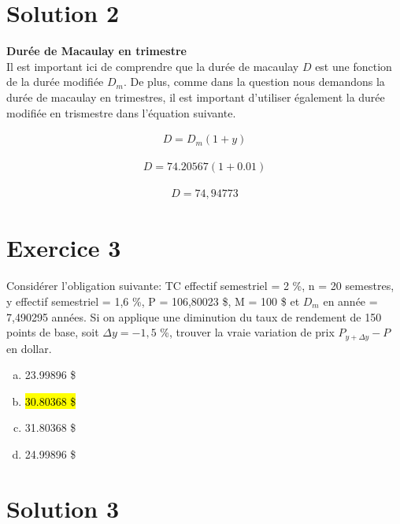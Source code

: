 \documentclass[10pt,a4paper]{article}
\begin{document}
\section*{Solution 2}

\textbf{Durée de Macaulay en trimestre} \\

Il est important ici de comprendre que la durée de macaulay $D$ est une fonction de la durée modifiée $D_m$.  De plus,  comme dans la question nous demandons la durée de macaulay en trimestres,  il est important d'utiliser également la durée modifiée en trismestre dans l'équation suivante.

\begin{align*}
D=D_m (1+y)
\end{align*}

\begin{align*}
D=74.20567 (1+0.01)
\end{align*}

\begin{align*}
D = 74,94773 
\end{align*}


\newpage

\section*{Exercice 3}
Considérer l’obligation suivante: TC effectif semestriel = 2 \%, n = 20 semestres, y effectif semestriel = 1,6 \%, P = 106,80023 \$, M = 100 \$ et $D_m$ en année = 7,490295 années.  Si on applique une diminution du taux de rendement de 150 points de base,  soit $\Delta y = -1,5$ \%,  trouver la vraie variation de prix $P_{y+\Delta y} - P$ en dollar.


\begin{enumerate}[a)]
\item 23.99896 \$ 
\item \hl{30.80368 \$}
\item 31.80368 \$
\item  24.99896 \$
\end{enumerate}

\section*{Solution 3}
\end{document}

